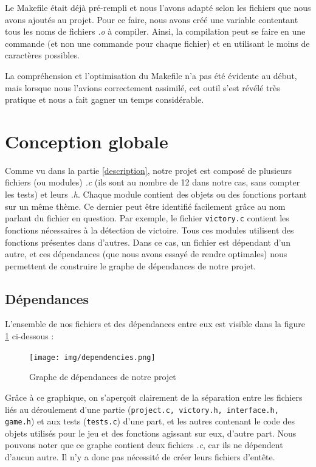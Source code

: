 \documentclass[a4paper]{article}
\begin{document}
Le Makefile était déjà pré-rempli et nous l'avons adapté selon les fichiers que nous avons ajoutés au projet. Pour ce faire, nous avons créé une variable contentant tous les noms de fichiers \emph{.o} à compiler. Ainsi, la compilation peut se faire en une commande (et non une commande pour chaque fichier) et en utilisant le moins de caractères possibles.

La compréhension et l'optimisation du Makefile n'a pas été évidente au début, mais lorsque nous l'avions correctement assimilé, cet outil s'est révélé très pratique et nous a fait gagner un temps considérable.

\section{Conception globale}
\label{conception}

Comme vu dans la partie \ref{description}, notre projet est composé de plusieurs fichiers (ou modules) \emph{.c} (ils sont au nombre de 12 dans notre cas, sans compter les tests) et leurs \emph{.h}. Chaque module contient des objets ou des fonctions portant sur un même thème. Ce dernier peut être identifié facilement grâce au nom parlant du fichier en question. Par exemple, le fichier \verb|victory.c| contient les fonctions nécessaires à la détection de victoire. Tous ces modules utilisent des fonctions présentes dans d'autres. Dans ce cas, un fichier est dépendant d'un autre, et ces dépendances (que nous avons essayé de rendre optimales) nous permettent de construire le graphe de dépendances de notre projet.

\subsection{Dépendances}
\label{dep}

L'ensemble de nos fichiers et des dépendances entre eux est visible dans la figure \ref{fig:dep} ci-dessous :

\begin{center}
\begin{figure}[H]
    \centering
    \texttt{[image: img/dependencies.png]}~\\[0.5 cm]
    \caption{Graphe de dépendances de notre projet}
    \label{fig:dep}
\end{figure}
\end{center}

Grâce à ce graphique, on s'aperçoit clairement de la séparation entre les fichiers liés au déroulement d'une partie (\verb|project.c, victory.h, interface.h, game.h|) et aux tests (\verb|tests.c|) d'une part, et les autres contenant le code des objets utilisés pour le jeu et des fonctions agissant sur eux, d'autre part. Nous pouvons noter que ce graphe contient deux fichiers \emph{.c}, car ils ne dépendent d'aucun autre. Il n'y a donc pas nécessité de créer leurs fichiers d'entête.
\end{document}
